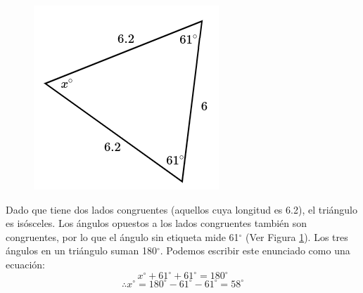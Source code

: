 \begin{minipage}[t][][t]{0.6\textwidth}
    \begin{solutionbox}{8cm}
        \begin{minipage}{0.3\textwidth}
            \begin{figure}[H]
                \centering
                \includegraphics[width=0.9\linewidth]{../images/findangle04a.png}
                \caption{}
                \label{fig:findangle04a}
            \end{figure}
        \end{minipage}\hfill
        \begin{minipage}{0.65\textwidth}
            Dado que tiene dos lados congruentes (aquellos cuya longitud es 6.2), el triángulo es isósceles. Los ángulos opuestos a los lados congruentes también son congruentes, por lo que el ángulo sin etiqueta mide 61$^\circ$ (Ver Figura \ref{fig:findangle04a}).
            Los tres ángulos en un triángulo suman 180$^\circ$. Podemos escribir este enunciado como una ecuación:
            \[x^\circ + 61^\circ + 61^\circ = 180^\circ \]
            \[\therefore x^\circ = 180^\circ - 61^\circ - 61^\circ = 58^\circ\]
        \end{minipage}
    \end{solutionbox}
\end{minipage}